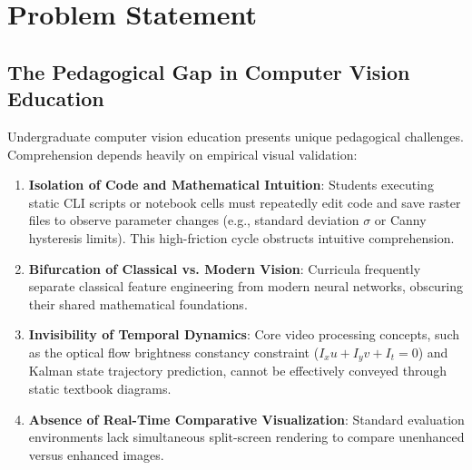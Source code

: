 \documentclass[12pt,a4paper]{article}
\begin{document}
\section{Problem Statement}

\subsection{The Pedagogical Gap in Computer Vision Education}
Undergraduate computer vision education presents unique pedagogical challenges. Comprehension depends heavily on empirical visual validation:
\begin{enumerate}
    \item \textbf{Isolation of Code and Mathematical Intuition}: Students executing static CLI scripts or notebook cells must repeatedly edit code and save raster files to observe parameter changes (e.g., standard deviation $\sigma$ or Canny hysteresis limits). This high-friction cycle obstructs intuitive comprehension.
    \item \textbf{Bifurcation of Classical vs. Modern Vision}: Curricula frequently separate classical feature engineering from modern neural networks, obscuring their shared mathematical foundations.
    \item \textbf{Invisibility of Temporal Dynamics}: Core video processing concepts, such as the optical flow brightness constancy constraint ($I_x u + I_y v + I_t = 0$) and Kalman state trajectory prediction, cannot be effectively conveyed through static textbook diagrams.
    \item \textbf{Absence of Real-Time Comparative Visualization}: Standard evaluation environments lack simultaneous split-screen rendering to compare unenhanced versus enhanced images.
\end{enumerate}
\end{document}
